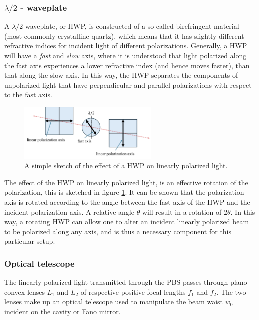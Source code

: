 \subsubsection{$\lambda / 2$ - waveplate}

A $\lambda/2$-waveplate, or HWP, is constructed of a so-called birefringent material (most commonly crystalline quartz), which means that it has slightly different refractive indices for incident light of different polarizations. Generally, a HWP will have a \emph{fast} and \emph{slow} axis, where it is understood that light polarized along the fast axis experiences a lower refractive index (and hence moves faster), than that along the slow axis. In this way, the HWP separates the components of unpolarized light that have perpendicular and parallel polarizations with respect to the fast axis. 

\begin{figure}[h!]
    \centering
    \includegraphics[width=0.6\textwidth]{figures/HWP.pdf}
    \caption{A simple sketch of the effect of a HWP on linearly polarized light.}
    \label{fig:HWP}
\end{figure}

The effect of the HWP on linearly polarized light, is an effective rotation of the polarization, this is sketched in figure \ref{fig:HWP}. It can be shown that the polarization axis is rotated according to the angle between the fast axis of the HWP and the incident polarization axis. A relative angle $\theta$ will result in a rotation of $2\theta$\cite{edmund_optics}. In this way, a rotating HWP can allow one to alter an incident linearly polarized beam to be polarized along any axis, and is thus a necessary component for this particular setup.

\subsubsection{Optical telescope}

The linearly polarized light transmitted through the PBS passes through plano-convex lenses $L_1$ and $L_2$ of respective positive focal lengths $f_1$ and $f_2$. The two lenses make up an optical telescope used to manipulate the beam waist $w_0$ incident on the cavity or Fano mirror. 

